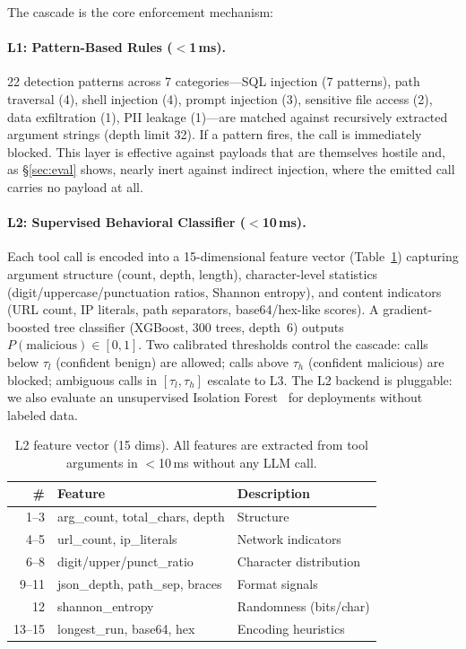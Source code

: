 \documentclass[11pt]{article}
\begin{document}
The cascade is the core enforcement mechanism:

\paragraph{L1: Pattern-Based Rules ($<$1\,ms).}
22 detection patterns across 7 categories---SQL injection (7 patterns), path traversal (4), shell injection (4), prompt injection (3), sensitive file access (2), data exfiltration (1), PII leakage (1)---are matched against recursively extracted argument strings (depth limit 32). If a pattern fires, the call is immediately blocked. This layer is effective against payloads that are themselves hostile and, as \S\ref{sec:eval} shows, nearly inert against indirect injection, where the emitted call carries no payload at all.

\paragraph{L2: Supervised Behavioral Classifier ($<$10\,ms).}
Each tool call is encoded into a 15-dimensional feature vector (Table~\ref{tab:features}) capturing argument structure (count, depth, length), character-level statistics (digit/uppercase/punctuation ratios, Shannon entropy), and content indicators (URL count, IP literals, path separators, base64/hex-like scores).
A gradient-boosted tree classifier (XGBoost, 300 trees, depth~6) outputs $P(\text{malicious}) \in [0,1]$.
Two calibrated thresholds control the cascade: calls below $\tau_l$ (confident benign) are allowed; calls above $\tau_h$ (confident malicious) are blocked; ambiguous calls in $[\tau_l, \tau_h]$ escalate to L3.
The L2 backend is pluggable: we also evaluate an unsupervised Isolation Forest~\cite{zhao2019pyod} for deployments without labeled data.

\begin{table}[t]
\centering
\scriptsize
\caption{L2 feature vector (15 dims). All features are extracted from tool arguments in $<$10\,ms without any LLM call.}
\vspace{-0.1in}
\label{tab:features}
\setlength{\tabcolsep}{2.5pt}
\begin{tabular}{rll}
\toprule
\# & Feature & Description \\
\midrule
1--3 & arg\_count, total\_chars, depth & Structure \\
4--5 & url\_count, ip\_literals & Network indicators \\
6--8 & digit/upper/punct\_ratio & Character distribution \\
9--11 & json\_depth, path\_sep, braces & Format signals \\
12 & shannon\_entropy & Randomness (bits/char) \\
13--15 & longest\_run, base64, hex & Encoding heuristics \\
\bottomrule
\end{tabular}
\vspace{-0.15in}
\end{table}
\end{document}
